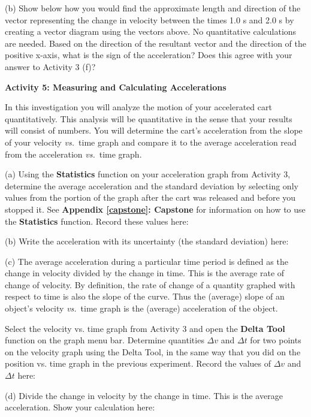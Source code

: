 (b) Show below how you would find the approximate length and direction of the
vector representing the change in velocity between the times 1.0 s and 2.0 s
by creating a vector diagram using the vectors above. No quantitative 
calculations are needed. Based on the direction of the resultant vector and 
the direction of the positive x-axis, what is the sign of the acceleration? 
Does this agree with your answer to Activity 3 (f)?
\answerspace{20mm}

\textbf{Activity 5: Measuring and Calculating Accelerations}

In this investigation you will analyze the motion of your accelerated cart quantitatively.
This analysis will be quantitative in the sense that your results will consist
of numbers. You will determine the cart's acceleration from the slope of your
velocity \textit{vs.}~time graph and compare it to the average acceleration read from
the acceleration \textit{vs.}~time graph. 

(a) Using the \textbf{Statistics} function on your acceleration graph from Activity 3, determine the average acceleration and the standard deviation by selecting only values from the portion of the graph after the cart was released and before you stopped it. See \textbf{Appendix \ref{capstone}: Capstone} for information on how to use the \textbf{Statistics} function. Record these values here:
\answerspace{20mm}

(b) Write the acceleration with its uncertainty (the standard deviation) here:
\answerspace{20mm}

(c) The average acceleration during a particular time period is defined as the
change in velocity divided by the change in time. This is the average rate of
change of velocity. By definition, the rate of change of a quantity graphed
with respect to time is also the slope of the curve. Thus the (average) slope
of an object's velocity \textit{vs.}~time graph is the (average) acceleration of the
object.

Select the velocity vs. time graph from Activity 3 and open the \textbf{Delta Tool} function on the graph menu bar. Determine quantities \( \Delta v\) and \( \Delta t\) for two points on the velocity graph using the Delta Tool, 
in the same way that you did on the position vs. time graph in the previous experiment. Record the values of 
\( \Delta v\) and \( \Delta t\) here:
\answerspace{20mm}

(d) Divide the change in velocity by the change in time. This is the average acceleration. Show your calculation here:
\answerspace{20mm}

